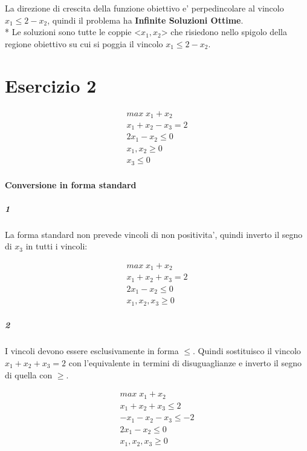 \documentclass[a4paper,12pt,oneside]{article}
\begin{document}
    La direzione di crescita della funzione obiettivo e' perpedincolare al vincolo $x_1 \leq 2 - x_2$, quindi il problema ha \textbf{Infinite Soluzioni Ottime}. \\*
    Le soluzioni sono tutte le coppie <$x_1, x_2$> che risiedono nello spigolo della regione obiettivo su cui si poggia il vincolo $x_1 \leq 2 - x_2$.

    \section{Esercizio 2}

    \begin{align}
        \text{$max \; x_1 + x_2$} \\
        \text{$x_1 + x_2 - x_3 = 2$} \\
        \text{$2 x_1 - x_2 \leq 0$} \\
        \text{$x_1, x_2 \geq 0$} \\
        \text{$x_3 \leq 0$}
    \end{align}

    \paragraph{Conversione in forma standard}

    \subparagraph{1}

    La forma standard non prevede vincoli di non positivita', quindi inverto il segno di $x_3$ in tutti i vincoli:

    \begin{align}
        \text{$max \; x_1 + x_2$} \\
        \text{$x_1 + x_2 + x_3 = 2$} \\
        \text{$2 x_1 - x_2 \leq 0$} \\
        \text{$x_1, x_2, x_3 \geq 0$}
    \end{align}

    \subparagraph{2}

    I vincoli devono essere esclusivamente in forma $\leq$.
    Quindi sostituisco il vincolo $x_1 + x_2 + x_3 = 2$ con l'equivalente in termini di disuguaglianze e inverto il segno di quella con $\geq$.

    \begin{align}
        \text{$max \; x_1 + x_2$} \\
        \text{$x_1 + x_2 + x_3 \leq 2$} \\
        \text{$- x_1 - x_2 - x_3 \leq - 2$} \\
        \text{$2 x_1 - x_2 \leq 0$} \\
        \text{$x_1, x_2, x_3 \geq 0$}
    \end{align}
\end{document}

